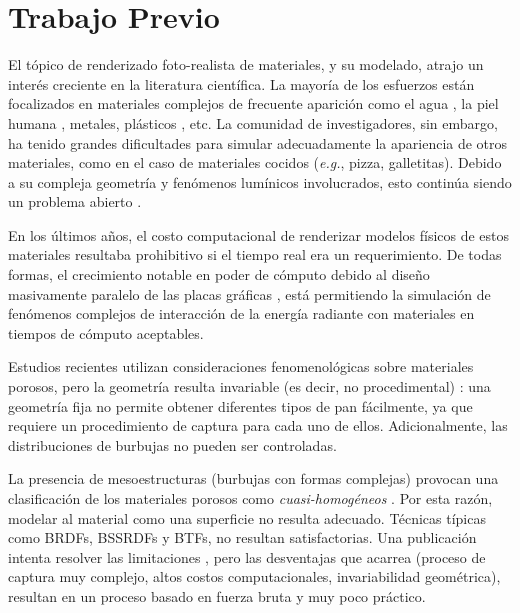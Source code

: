 \section{Trabajo Previo}
El tópico de renderizado foto-realista de materiales, y su modelado, atrajo un interés creciente en la literatura científica.
La mayoría de los esfuerzos están focalizados en materiales complejos de frecuente aparición como el agua \cite{Schechter2012}, la piel humana \cite{Donner2006}, metales, plásticos \cite{Kurt2010}, etc.
La comunidad de investigadores, sin embargo, ha tenido grandes dificultades para simular adecuadamente la apariencia de otros materiales, como en el caso de materiales cocidos ({\em e.g.}, pizza, galletitas).
Debido a su compleja geometría y fenómenos lumínicos involucrados, esto continúa siendo un problema abierto \cite{Voglsam2013}.

En los últimos años, el costo computacional de renderizar modelos físicos de estos materiales resultaba prohibitivo si el tiempo real era un requerimiento.
De todas formas, el crecimiento notable en poder de cómputo debido al diseño masivamente paralelo de las placas gráficas \cite{Yeo09,Harris06}, está permitiendo la simulación de fenómenos complejos de interacción de la energía radiante con materiales en tiempos de cómputo aceptables.


Estudios recientes utilizan consideraciones fenomenológicas sobre materiales porosos, pero la geometría resulta invariable (es decir, no procedimental) \cite{VanDyck2014}: una geometría fija no permite obtener diferentes tipos de pan fácilmente, ya que requiere un procedimiento de captura para cada uno de ellos.
Adicionalmente, las distribuciones de burbujas no pueden ser controladas.

La presencia de mesoestructuras (burbujas con formas complejas) provocan una clasificación de los materiales porosos como {\em cuasi-homogéneos} \cite{Tong2005}. 
Por esta razón, modelar al material como una superficie no resulta adecuado.
Técnicas típicas como BRDFs, BSSRDFs \cite{Donner2009} y BTFs, no resultan satisfactorias.
Una publicación intenta resolver las limitaciones \cite{Tong2005}, pero las desventajas que acarrea (proceso de captura muy complejo, altos costos computacionales, invariabilidad geométrica), resultan en un proceso basado en fuerza bruta y muy poco práctico.

